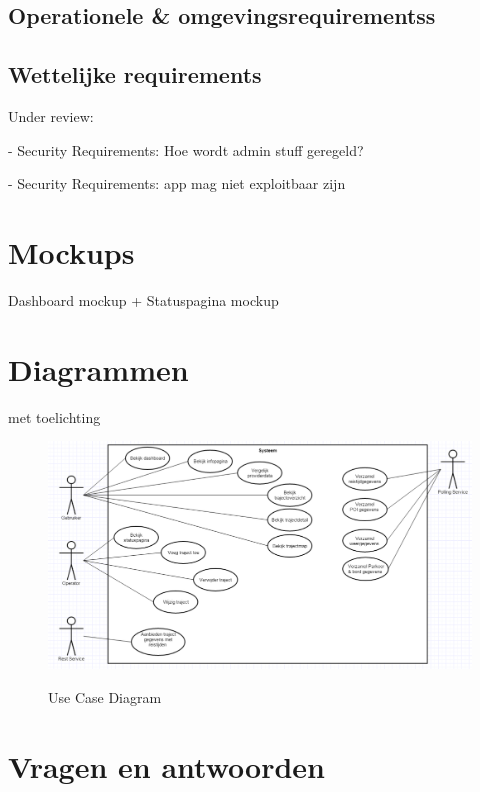 \documentclass[a4paper]{article}
\begin{document}
\subsection{Operationele \& omgevingsrequirementss}

\subsection{Wettelijke requirements}


Under review:


- Security Requirements: Hoe wordt admin stuff geregeld?

- Security Requirements: app mag niet exploitbaar zijn




\section{Mockups}

Dashboard mockup + Statuspagina mockup

\section{Diagrammen}
met toelichting

\begin{figure}[H]
\centering
\includegraphics[width=\textwidth]{Images/usecasediagramv3.png}\\
\caption{Use Case Diagram}
\end{figure}

\section{Vragen en antwoorden}
\end{document}
